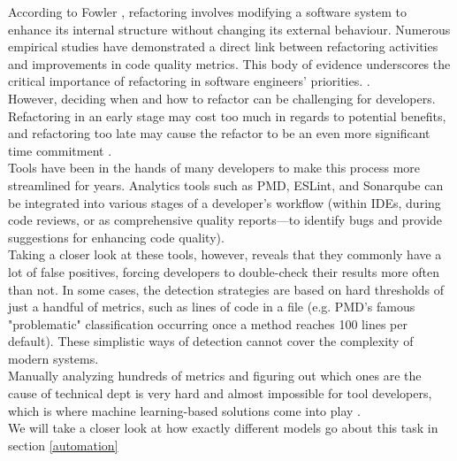 According to Fowler \cite{fowler2018refactoring}, refactoring involves modifying a software system to enhance its internal structure without changing its external behaviour. Numerous empirical studies have demonstrated a direct link between refactoring activities and improvements in code quality metrics. This body of evidence underscores the critical importance of refactoring in software engineers' priorities. \cite{aniche2020effectiveness}.\\
However, deciding when and how to refactor can be challenging for developers. Refactoring in an early stage may cost too much in regards to potential benefits, and refactoring too late may cause the refactor to be an even more significant time commitment \cite{kruchten2012technical}.\\
Tools have been in the hands of many developers to make this process more streamlined for years. Analytics tools such as PMD, ESLint, and Sonarqube can be integrated into various stages of a developer's workflow (within IDEs, during code reviews, or as comprehensive quality reports—to identify bugs and provide suggestions for enhancing code quality)\cite{aniche2020effectiveness}.\\
Taking a closer look at these tools, however, reveals that they commonly have a lot of false positives, forcing developers to double-check their results more often than not. In some cases, the detection strategies are based on hard thresholds of just a handful of metrics, such as lines of code in a file (e.g. PMD's famous "problematic" classification occurring once a method reaches 100 lines per default)\cite{aniche2020effectiveness}. These simplistic ways of detection cannot cover the complexity of modern systems.\\
Manually analyzing hundreds of metrics and figuring out which ones are the cause of technical dept is very hard and almost impossible for tool developers, which is where machine learning-based solutions come into play \cite{leitch2003maintainability}.\\
We will take a closer look at how exactly different models go about this task in section \ref{automation}
